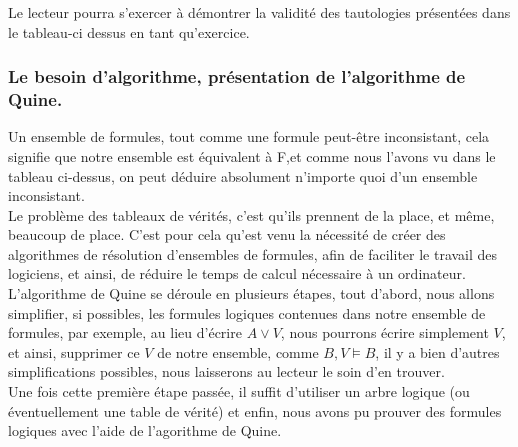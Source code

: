 \documentclass[a4paper, 12pt]{article}
\numberwithin{equation}{subsection}
\begin{document}
\FloatBarrier
Le lecteur pourra s'exercer à démontrer la validité des tautologies présentées dans le tableau-ci dessus en tant qu'exercice. \\
\subsubsection{Le besoin d'algorithme, présentation de l'algorithme de Quine.}

Un ensemble de formules, tout comme une formule peut-être inconsistant, cela signifie que notre ensemble est équivalent à F,et comme nous l'avons vu dans le tableau ci-dessus, on peut déduire absolument n'importe quoi d'un ensemble inconsistant.\\

Le problème des tableaux de vérités, c'est qu'ils prennent de la place, et même, beaucoup de place. C'est pour cela qu'est venu la nécessité de créer des algorithmes de résolution d'ensembles de formules, afin de faciliter le travail des logiciens, et ainsi, de réduire le temps de calcul nécessaire à un ordinateur. \\

L'algorithme de Quine se déroule en plusieurs étapes, tout d'abord, nous allons simplifier, si possibles, les formules logiques contenues dans notre ensemble de formules, par exemple, au lieu d'écrire $A \lor V$, nous pourrons écrire simplement $ V $, et ainsi, supprimer ce $V$ de notre ensemble, comme $B, V \models B$, il y a bien d'autres simplifications possibles, nous laisserons au lecteur le soin d'en trouver.\\

Une fois cette première étape passée, il suffit d'utiliser un arbre logique (ou éventuellement une table de vérité) et enfin, nous avons pu prouver des formules logiques avec l'aide de l'agorithme de Quine.
\end{document}
